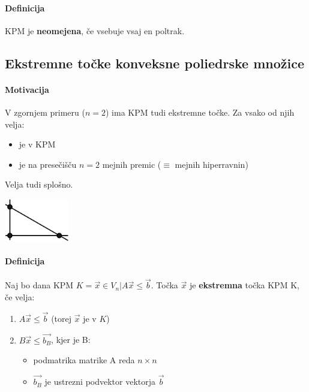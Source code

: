 \documentclass[a4paper,10pt]{article}
\begin{document}
\paragraph{Definicija}
KPM je \textbf{neomejena}, \v ce vsebuje vsaj en poltrak.

\subsection{Ekstremne to\v cke konveksne poliedrske mno\v zice}

\paragraph{Motivacija}
V zgornjem primeru ($n = 2$) ima KPM tudi ekstremne to\v cke. Za vsako od njih velja:
\begin{itemize}
\item je v KPM
\item je na prese\v ci\v s\v cu $n = 2$ mejnih premic ($\equiv$ mejnih hiperravnin)
\end{itemize}
Velja tudi splo\v sno.
	\begin{center}
	\includegraphics[width=2.8cm,height=1.85cm]{Slike/EkstremneTockeMotivacija.png}
	\end{center}

\paragraph{Definicija}
Naj bo dana KPM $K = {\vec x \in V_n | A \vec x \leq \vec b}$. To\v cka $\vec x$ je \textbf{ekstremna} to\v cka KPM K, \v ce velja:
\begin{enumerate}
\item $A \vec x \leq \vec b$ (torej $\vec x$ je v $K$)
\item $B \vec x \leq \vec{b_B}$, kjer je B:
	\begin{itemize}
	\item podmatrika matrike A reda $n \times n$
	\item $\vec{b_B}$ je ustrezni podvektor vektorja $\vec b$
	\end{itemize}
\end{enumerate}
\end{document}
